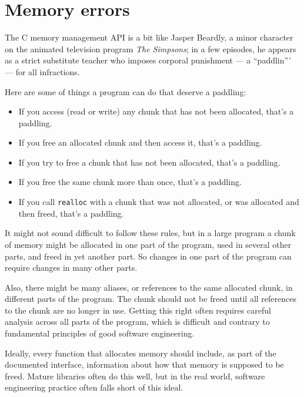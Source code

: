 \documentclass[12pt]{book}
\begin{document}
{\section{Memory errors}

The C memory management API is a bit like Jasper Beardly, a minor
character on the animated television program {\it The Simpsons}; 
in a few episodes, he appears as a strict substitute teacher who imposes corporal punishment --- a ``paddlin''' --- for all infractions.

Here are some of things a program can do that deserve a paddling:

\begin{itemize}

\item If you access (read or write) any chunk that has not been
allocated, that's a paddling.

\item If you free an allocated chunk and then access it, that's
a paddling.

\item If you try to free a chunk that has not been allocated,
that's a paddling.

\item If you free the same chunk more than once, that's a paddling.

\item If you call {\tt realloc} with a chunk that was not allocated,
or was allocated and then freed, that's a paddling.

\end{itemize}

It might not sound difficult to follow these rules, but in a large
program a chunk of memory might be allocated in one part of the
program, used in several other parts, and freed in yet another
part.  So changes in one part of the program can require changes
in many other parts.

Also, there might be many aliases, or references to the same allocated
chunk, in different parts of the program.  The chunk should not be
freed until all references to the chunk are no longer in use.  
Getting this right often requires careful analysis across all parts
of the program, which is difficult and contrary to fundamental
principles of good software engineering.

Ideally, every function that allocates memory should include, as part
of the documented interface, information about how that memory is supposed
to be freed.  Mature libraries often do this well, but in the real world,
software engineering practice often falls short of this ideal.

}
\end{document}
